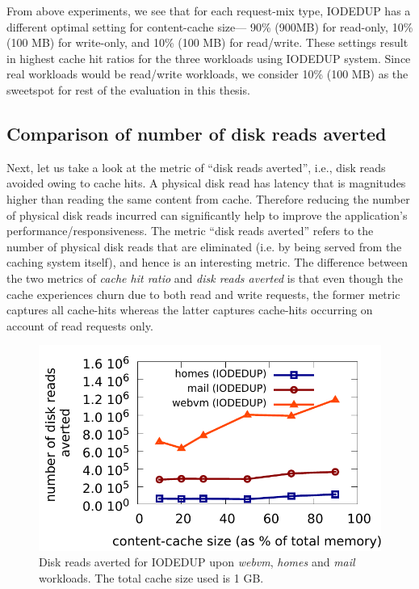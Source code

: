 From above experiments, we see that for each request-mix type, IODEDUP has a
different optimal setting for content-cache size---
90\% (900MB) for read-only,
10\% (100 MB) for write-only, and
10\% (100 MB) for read/write.
These settings result in highest cache hit
ratios for the three workloads using IODEDUP system. Since real
workloads would be read/write workloads, we consider 10\% (100 MB) as
the sweetspot for rest of the evaluation in this thesis.

\subsection{Comparison of number of disk reads averted}
Next, let us take
a look at the metric of ``disk reads averted'', i.e., disk reads avoided owing
to cache hits. 
A physical disk read has latency that is magnitudes higher than reading the 
same content from cache. Therefore reducing the number of physical disk reads 
incurred can significantly help to improve the application’s performance/responsiveness. 
The metric ``disk reads averted'' refers to the number of physical disk reads 
that are eliminated (i.e. by being served from the caching system itself), and 
hence is an interesting metric.
The difference between the two metrics of \textit{cache hit
ratio} and 
\textit{disk reads averted} 
is that even though the cache
experiences churn due to both read and write requests, the former metric
captures all cache-hits whereas the latter captures cache-hits
occurring on account of read requests only.

\begin{figure}
    \centering
    \includegraphics[scale=0.65]{confided-figures/sweetspot/reads-writes/sweetspotaverted-reads-n-writes.pdf}
\caption{Disk reads averted for IODEDUP upon \textit{webvm}, \textit{homes} and \textit{mail} workloads. The total cache size used is 1 GB.}
\label{fig:sweetspot-averted}
\end{figure}

